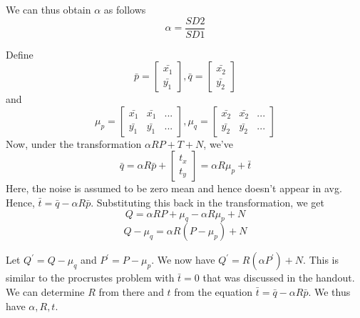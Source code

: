 \documentclass[11pt]{article}
\begin{document}
\begin{enumerate}
\begin{itemize}
We can thus obtain $\alpha$ as follows 
\begin{equation}
\alpha=\frac{SD2}{SD1}
\end{equation} 

Define \[ \bar{p}=
		\begin{bmatrix}
		\bar{x_1}\\
		\bar{y_1}
		\end{bmatrix}		  
		, \bar{q}=
		\begin{bmatrix}
		\bar{x_2}\\
		\bar{y_2}
		\end{bmatrix}		  
		\] 
		and
		\[ \mu_p=
		\begin{bmatrix}
		\bar{x_1} & \bar{x_1} & ...\\
		\bar{y_1} & \bar{y_1} & ...
		\end{bmatrix}		  
		, \mu_q=
		\begin{bmatrix}
		\bar{x_2} & \bar{x_2} & ...\\
		\bar{y_2} & \bar{y_2} & ...
		\end{bmatrix}		  
		\] 
Now, under the transformation $\alpha RP+T+N$, we've 
\begin{equation}
\bar{q}=\alpha R\bar{p} + \begin{bmatrix}
        t_x\\
        t_y
        \end{bmatrix}=\alpha R\mu_p + \bar{t}
\end{equation}
Here, the noise is assumed to be zero mean and hence doesn't appear in avg. 
        Hence, $\bar{t}=\bar{q}-\alpha R\bar{p}$. Substituting this back in the transformation, we get 
        \begin{equation}
        Q= \alpha RP+ \mu_q-\alpha R\mu_p+N
        \end{equation} 
        \begin{equation}
        Q-\mu_q= \alpha R(P -\mu_p)+N
        \end{equation} 
              	
Let $Q^{'}=Q-\mu_q$ and $P^{'}=P -\mu_p$. We now have $Q^{'}=R(\alpha P^{'})+N$. This is similar to the procrustes problem with $\bar{t} =0$ that was discussed in the handout. We can determine $R$ from there and $t$ from the equation $\bar{t}=\bar{q}-\alpha R\bar{p}$.
        We thus have $\alpha, R , t$.  
\end{itemize}




\end{enumerate}
\end{document}
